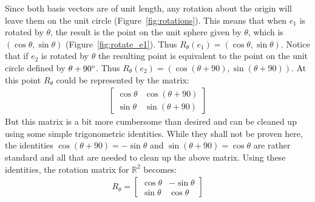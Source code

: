 \documentclass[12pt,letter]{article}
\begin{document}
Since both basis vectors are of unit length, any rotation about the origin will leave them on the unit circle (Figure~\ref{fig:rotations}). This means that when $e_1$ is rotated by $\theta$, the result is the point on the unit sphere given by $\theta$, which is $(\cos{\theta} , \sin{\theta})$ (Figure~\ref{fig:rotate_e1}). Thus $R_\theta(e_1) = (\cos{\theta} , \sin{\theta})$. Notice that if $e_2$ is rotated by $\theta$ the resulting point is equivalent to the point on the unit circle defined by $\theta + 90\degree$. Thus $R_\theta(e_2) = (\cos{(\theta + 90)} , \sin{(\theta + 90)})$. At this point $R_\theta$ could be represented by the matrix:
%
\begin{align*}
	\begin{bmatrix}
		\cos{\theta} & \cos{(\theta + 90)} \\
		\sin{\theta} & \sin{(\theta + 90)}
	\end{bmatrix}
\end{align*}
%
But this matrix is a bit more cumbersome than desired and can be cleaned up using some simple trigonometric identities. While they shall not be proven here, the identities $\cos{(\theta + 90)} = -\sin{\theta}$ and $\sin{(\theta + 90)} = \cos{\theta}$ are rather standard and all that are needed to clean up the above matrix. Using these identities, the rotation matrix for $\mathbb{R}^2$ becomes:
\begin{align}
	R_\theta =
	\begin{bmatrix}
		\cos{\theta} & -\sin{\theta} \\
		\sin{\theta} & \cos{\theta}
	\end{bmatrix}
	\label{eq:rotate}
\end{align}
\end{document}
